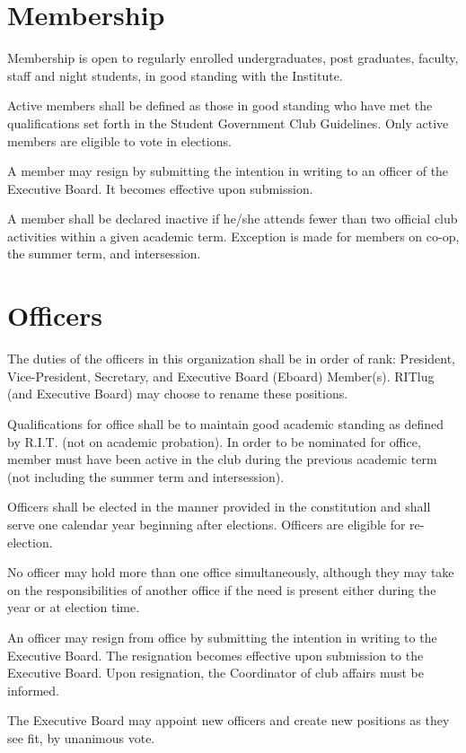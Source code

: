 \section{Membership}
\begin{subroutines}
\item Membership is open to regularly enrolled undergraduates, post graduates, faculty, staff and night students, in good standing with the Institute.
\item Active members shall be defined as those in good standing who have met the qualifications set forth in the Student Government Club Guidelines. Only active members are eligible to vote in elections.
\item A member may resign by submitting the intention in writing to an officer of the Executive Board. It becomes effective upon submission.
\item A member shall be declared inactive if he/she attends fewer than two official club activities within a given academic term. Exception is made for members on co-op, the summer term, and intersession.
\end{subroutines}

\section{Officers}
\begin{subroutines}
\item The duties of the officers in this organization shall be in order of rank: President, Vice-President, Secretary, and Executive Board (Eboard) Member(s). RITlug (and Executive Board) may choose to rename these positions.
\item Qualifications for office shall be to maintain good academic standing as defined by R.I.T. (not on academic probation). In order to be nominated for office, member must have been active in the club during the previous academic term (not including the summer term and intersession).
\item Officers shall be elected in the manner provided in the constitution and shall serve one calendar year beginning after elections. Officers are eligible for re-election.
\item No officer may hold more than one office simultaneously, although they may take on the responsibilities of another office if the need is present either during the year or at election time.
\item An officer may resign from office by submitting the intention in writing to the Executive Board. The resignation becomes effective upon submission to the Executive Board. Upon resignation, the Coordinator of club affairs must be informed.
\item The Executive Board may appoint new officers and create new positions as they see fit, by unanimous vote.
\end{subroutines}

